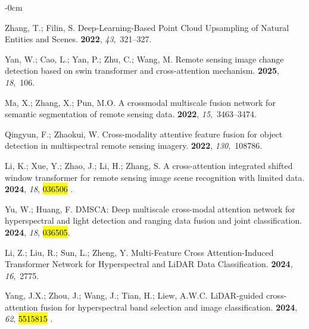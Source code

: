 \documentclass[remotesensing,article,accept,pdftex,moreauthors]{Definitions/mdpi}
\begin{document}
\begin{adjustwidth}{-\extralength}{0cm}
\begin{thebibliography}{999}
Zhang, T.; Filin, S.
\newblock Deep-Learning-Based Point Cloud Upsampling of Natural Entities and
  Scenes.
 {\bf 2022}, {\em 43},~321--327.

Yan, W.; Cao, L.; Yan, P.; Zhu, C.; Wang, M.
\newblock Remote sensing image change detection based on swin transformer and
  cross-attention mechanism.
 {\bf 2025}, {\em 18},~106.

Ma, X.; Zhang, X.; Pun, M.O.
\newblock A crossmodal multiscale fusion network for semantic segmentation of
  remote sensing data.
 {\bf 2022}, {\em 15},~3463--3474.

Qingyun, F.; Zhaokui, W.
\newblock Cross-modality attentive feature fusion for object detection in
  multispectral remote sensing imagery.
 {\bf 2022}, {\em 130},~108786.

Li, K.; Xue, Y.; Zhao, J.; Li, H.; Zhang, S.
\newblock A cross-attention integrated shifted window transformer for remote
  sensing image scene recognition with limited data.
 {\bf 2024}, {\em
  18}, \hl{036506}%
.

Yu, W.; Huang, F.
\newblock DMSCA: Deep multiscale cross-modal attention network for
  hyperspectral and light detection and ranging data fusion and joint
  classification.
 {\bf 2024}, {\em
  18}, \hl{036505}.

Li, Z.; Liu, R.; Sun, L.; Zheng, Y.
\newblock Multi-Feature Cross Attention-Induced Transformer Network for
  Hyperspectral and LiDAR Data Classification.
 {\bf 2024}, {\em 16},~2775.

Yang, J.X.; Zhou, J.; Wang, J.; Tian, H.; Liew, A.W.C.
\newblock LiDAR-guided cross-attention fusion for hyperspectral band selection
  and image classification.
 {\bf 2024},
  {\em 62}, \hl{5515815}%
.


\end{thebibliography}
\end{adjustwidth}
\end{document}
